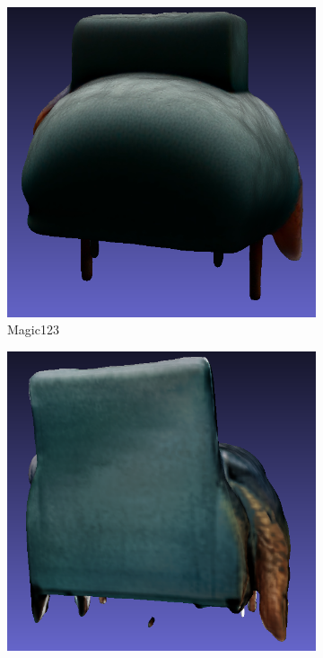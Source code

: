\begin{figure}[ht]
    \begin{subfigure}[b]{0.261\textwidth}
        \centering
        \includegraphics[width=\textwidth]{etc/a high-quality rendering of a big dog sleeping on a chair/magic123/magic123_dog_back_result.png}
        \caption{Magic123}
        \vspace{0.1cm}
    \end{subfigure}
    \begin{subfigure}[b]{0.27\textwidth}
        \centering
        \includegraphics[width=\textwidth]{etc/a high-quality rendering of a big dog sleeping on a chair/wonder3D/wonder3D_dog_back_result.png}

\end{subfigure}
\end{figure}
